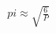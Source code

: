 \documentclass[preview]{standalone}
\begin{document}
\begin{align*}
\quad\\pi \approx \sqrt{\frac{6}{P}}
\end{align*}
\end{document}
